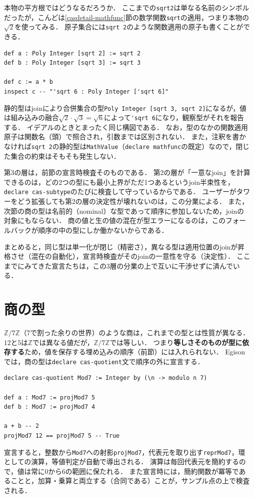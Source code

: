 本物の平方根ではどうなるだろうか．
ここまでの\lstinline{sqrt2}は単なる名前のシンボルだったが，こんどは\ref{casdetail-mathfunc}節の数学関数\lstinline{sqrt}の適用，つまり本物の$\sqrt{2}$を使ってみる．
原子集合には\lstinline{sqrt 2}のような関数適用の原子も書くことができる．
\begin{lstlisting}[language=egison,numbers=none]
def a : Poly Integer [sqrt 2] := sqrt 2
def b : Poly Integer [sqrt 3] := sqrt 3

def c := a * b
inspect c -- "'sqrt 6 : Poly Integer ['sqrt 6]"
\end{lstlisting}
静的型はjoinにより合併集合の型\lstinline{Poly Integer [sqrt 3, sqrt 2]}になるが，値は組み込みの融合$\sqrt{2} \cdot \sqrt{3} = \sqrt{6}$によって\lstinline{'sqrt 6}になり，観察型がそれを報告する．
イデアルのときとまったく同じ構図である．
なお，型のなかの関数適用原子は関数名（頭）で照合され，引数までは区別されない．
また，注釈を書かなければ\lstinline{sqrt 2}の静的型は\lstinline{MathValue}（\lstinline{declare mathfunc}の既定）なので，閉じた集合の約束はそもそも発生しない．

第3の層は，前節の宣言時検査そのものである．
第2の層が「一意なjoin」を計算できるのは，どの2つの型にも最小上界がただ1つあるというjoin半束性を，\lstinline{declare cas-subtype}のたびに検査して守っているからである．
ユーザーがタワーをどう拡張しても第2の層の決定性が壊れないのは，この分業による．
また，次節の商の型は名前的（nominal）な型であって順序に参加しないため，joinの対象にもならない．
商の値と生の値の混在が型エラーになるのは，このフォールバックが順序の中の型にしか働かないからである．

まとめると，同じ型は単一化が閉じ（精密さ），異なる型は適用位置のjoinが昇格させ（混在の自動化），宣言時検査がそのjoinの一意性を守る（決定性）．
ここまでにみてきた宣言たちは，この3層の分業の上で互いに干渉せずに済んでいる．

\section{商の型}\label{cas-quotient}

$\mathbb{Z}/7\mathbb{Z}$（7で割った余りの世界）のような商は，これまでの型とは性質が異なる．
$12$と$5$は$\mathbb{Z}$では異なる値だが，$\mathbb{Z}/7\mathbb{Z}$では等しい．
つまり\textbf{等しさそのものが型に依存する}ため，値を保存する埋め込みの順序（前節）には入れられない．
Egisonでは，商の型は\lstinline{declare cas-quotient}文で順序の外に宣言する．
\begin{lstlisting}[language=egison,numbers=none]
declare cas-quotient Mod7 := Integer by (\n -> modulo n 7)

def a : Mod7 := projMod7 5
def b : Mod7 := projMod7 4

a + b -- 2
projMod7 12 == projMod7 5 -- True
\end{lstlisting}
宣言すると，整数から\lstinline{Mod7}への射影\lstinline{projMod7}，代表元を取り出す\lstinline{reprMod7}，環としての演算，等値判定が自動で導出される．
演算は毎回代表元を簡約するので，値は常に$0$から$6$の範囲に保たれる．
また宣言時には，簡約関数が冪等であることと，加算・乗算と両立する（合同である）ことが，サンプル点の上で検査される．

